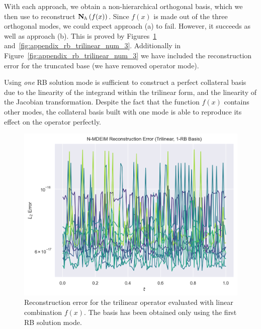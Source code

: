 \documentclass[../../thesis.tex]{subfiles}
\begin{document}
With each approach, we obtain a non-hierarchical orthogonal basis,
which we then use to reconstruct $\vb{N}_h\left(f(x)\right)$.
Since $f(x)$ is made out of the three orthogonal modes, 
we could expect approach (a) to fail.
However, it succeeds as well as approach (b).
This is proved by Figures~\ref{fig:appendix_rb_trilinear_num_1} 
and~\ref{fig:appendix_rb_trilinear_num_3}.
Additionally in Figure~\ref{fig:appendix_rb_trilinear_num_3} we have included 
the reconstruction error for the truncated base (we have removed operator mode). 

Using \textit{one} RB solution mode is sufficient to construct a perfect collateral basis
due to the linearity of the integrand within the trilinear form,
and the linearity of the Jacobian transformation.
Despite the fact that the function $f(x)$ contains other modes, 
the collateral basis built with one mode is able to reproduce its effect on the operator perfectly. 
\begin{figure}[h]
    \includegraphics[width=\columnwidth]{research_project/piston/figures/svd_fourier/trilinear_nonlinear/rb_basis_mdeim_errors_trilinear_num_1.png}
    \caption{Reconstruction error for the trilinear operator evaluated with linear combination $f(x)$.
    The basis has been obtained only using the first RB solution mode.}
    \label{fig:appendix_rb_trilinear_num_1}
\end{figure}
\end{document}

